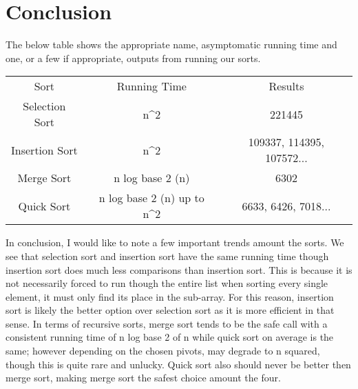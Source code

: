 \documentclass{article}
\begin{document}
\small
\section{Conclusion}
The below table shows the appropriate name, asymptomatic running time and one, or a few if appropriate, outputs from running our sorts. 
\begin{center}
\begin{tabular}{ c c c }
 Sort & Running Time & Results \\ 
 Selection Sort & n^2 & 221445 \\ 
 Insertion Sort & n^2 & 109337, 114395, 107572... \\  
 Merge Sort & n log base 2 (n) & 6302 \\
 Quick Sort & n log base 2 (n) up to n^2 & 6633, 6426, 7018...    
\end{tabular}
\end{center}

In conclusion, I would like to note a few important trends amount the sorts. We see that selection sort and insertion sort have the same running time though insertion sort does much less comparisons than insertion sort. This is because it is not necessarily forced to run though the entire list when sorting every single element, it must only find its place in the sub-array. For this reason, insertion sort is likely the better option over selection sort as it is more efficient in that sense. In terms of recursive sorts, merge sort tends to be the safe call with a consistent running time of n log base 2 of n while quick sort on average is the same; however depending on the chosen pivots, may degrade to n squared, though this is quite rare and unlucky. Quick sort also should never be better then merge sort, making merge sort the safest choice amount the four. 
\end{document}
